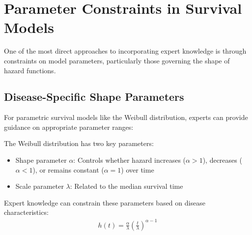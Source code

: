 \section{Parameter Constraints in Survival Models}

One of the most direct approaches to incorporating expert knowledge is through constraints on model parameters, particularly those governing the shape of hazard functions.

\subsection{Disease-Specific Shape Parameters}

For parametric survival models like the Weibull distribution, experts can provide guidance on appropriate parameter ranges:

\begin{equationbox}[title=Weibull Distribution Parameters]
The Weibull distribution has two key parameters:
\begin{itemize}
    \item Shape parameter $\alpha$: Controls whether hazard increases ($\alpha > 1$), decreases ($\alpha < 1$), or remains constant ($\alpha = 1$) over time
    \item Scale parameter $\lambda$: Related to the median survival time
\end{itemize}

Expert knowledge can constrain these parameters based on disease characteristics:
\begin{align}
    h(t) = \frac{\alpha}{\lambda}\left(\frac{t}{\lambda}\right)^{\alpha-1}
\end{align}
\end{equationbox}

